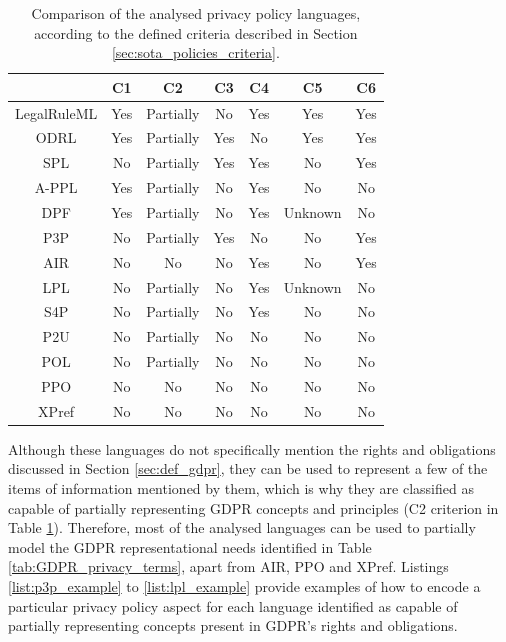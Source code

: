\begin{table}
\centering
\caption[Comparison of the analysed privacy policy languages.]{Comparison of the analysed privacy policy languages, according to the defined criteria described in Section \ref{sec:sota_policies_criteria}.}
\label{tab:languagesComparison} 
\begin{tabular}{ c||c|c|c|c|c|c}
 & C1 & C2 & C3 & C4 & C5 & C6 \\
 \hline\hline
 LegalRuleML & Yes & Partially & No & Yes & Yes & Yes \\
 \hline
 ODRL & Yes & Partially & Yes & No & Yes & Yes \\
  \hline
 SPL & No & Partially & Yes & Yes & No & Yes \\
 \hline
  A-PPL & Yes & Partially & No & Yes & No & No \\
 \hline
  DPF & Yes & Partially & No & Yes & Unknown & No \\
 \hline
  P3P & No & Partially & Yes & No & No & Yes \\
 \hline
  AIR & No & No & No & Yes & No & Yes \\
 \hline
  LPL & No & Partially & No & Yes & Unknown & No \\
  \hline
 S4P & No & Partially & No & Yes & No & No \\
 \hline
  P2U & No & Partially & No & No & No & No \\
 \hline
 POL & No & Partially & No & No & No & No \\
 \hline
  PPO & No & No & No & No & No & No \\
  \hline
 XPref & No & No & No & No & No & No \\
\end{tabular}
\end{table}

Although these languages do not specifically mention the rights and obligations discussed in Section \ref{sec:def_gdpr}, they can be used to represent a few of the items of information mentioned by them, which is why they are classified as capable of partially representing GDPR concepts and principles (C2 criterion in Table \ref{tab:languagesComparison}).
Therefore, most of the analysed languages can be used to partially model the GDPR representational needs identified in Table \ref{tab:GDPR_privacy_terms}, apart from AIR, PPO and XPref.
Listings \ref{list:p3p_example} to \ref{list:lpl_example} provide examples of how to encode a particular privacy policy aspect for each language identified as capable of partially representing concepts present in GDPR's rights and obligations.

